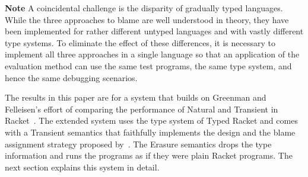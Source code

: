 {\bf Note} A coincidental challenge is the disparity of gradually typed
languages. While the three approaches to blame are well understood in theory,
they have been implemented for rather different untyped languages and with
vastly different type systems. To eliminate the effect of these differences, it
is necessary to implement all three approaches in a single language so that an
application of the evaluation method can use the same test programs, the same
type system, and hence the same debugging scenarios.

The results in this paper are for a system that builds on Greenman and
Felleisen's effort of comparing the performance of Natural and Transient in
Racket~\cite{gf-icfp-2018}. The extended system uses the type system of Typed
Racket and comes with a Transient semantics that faithfully implements the
design and the blame assignment strategy proposed by~\cite{vss-popl-2017}. The
Erasure semantics drops the type information and runs the programs as if they
were plain Racket programs. The next section explains this system in detail.
